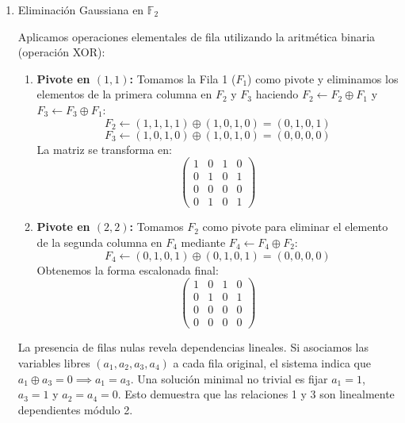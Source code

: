 \begin{ejemplo}
\begin{enumerate}
Planteamos el sistema homogéneo cuya matriz asociada dispone las columnas en el orden de los factores primos $\{2, 3, 5, 7\}$:
\[
M = \begin{pmatrix}
1 & 0 & 1 & 0 \\
1 & 1 & 1 & 1 \\
1 & 0 & 1 & 0 \\
0 & 1 & 0 & 1
\end{pmatrix}
\]

\item Eliminación Gaussiana en $\mathbb{F}_2$

Aplicamos operaciones elementales de fila utilizando la aritmética binaria (operación XOR):

\begin{enumerate}
    \item \textbf{Pivote en $(1,1)$:} Tomamos la Fila 1 ($F_1$) como pivote y eliminamos los elementos de la primera columna en $F_2$ y $F_3$ haciendo $F_2 \leftarrow F_2 \oplus F_1$ y $F_3 \leftarrow F_3 \oplus F_1$:
    \[
    F_2 \leftarrow (1, 1, 1, 1) \oplus (1, 0, 1, 0) = (0, 1, 0, 1)
    \]
    \[
    F_3 \leftarrow (1, 0, 1, 0) \oplus (1, 0, 1, 0) = (0, 0, 0, 0)
    \]
    La matriz se transforma en:
    \[
    \begin{pmatrix}
    1 & 0 & 1 & 0 \\
    0 & 1 & 0 & 1 \\
    0 & 0 & 0 & 0 \\
    0 & 1 & 0 & 1
    \end{pmatrix}
    \]

    \item \textbf{Pivote en $(2,2)$:} Tomamos $F_2$ como pivote para eliminar el elemento de la segunda columna en $F_4$ mediante $F_4 \leftarrow F_4 \oplus F_2$:
    \[
    F_4 \leftarrow (0, 1, 0, 1) \oplus (0, 1, 0, 1) = (0, 0, 0, 0)
    \]
    Obtenemos la forma escalonada final:
    \[
    \begin{pmatrix}
    1 & 0 & 1 & 0 \\
    0 & 1 & 0 & 1 \\
    0 & 0 & 0 & 0 \\
    0 & 0 & 0 & 0
    \end{pmatrix}
    \]
\end{enumerate}

La presencia de filas nulas revela dependencias lineales. Si asociamos las variables libres $(a_1, a_2, a_3, a_4)$ a cada fila original, el sistema indica que $a_1 \oplus a_3 = 0 \implies a_1 = a_3$. Una solución minimal no trivial es fijar $a_1 = 1$, $a_3 = 1$ y $a_2 = a_4 = 0$. Esto demuestra que las relaciones 1 y 3 son linealmente dependientes módulo 2.


\end{enumerate}
\end{ejemplo}
